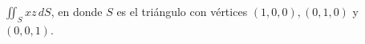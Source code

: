 \item $\iint_S xz \, dS$, en donde $S$ es el triángulo con vértices $(1, 0, 0), (0, 1, 0)$ y $(0, 0, 1)$.

